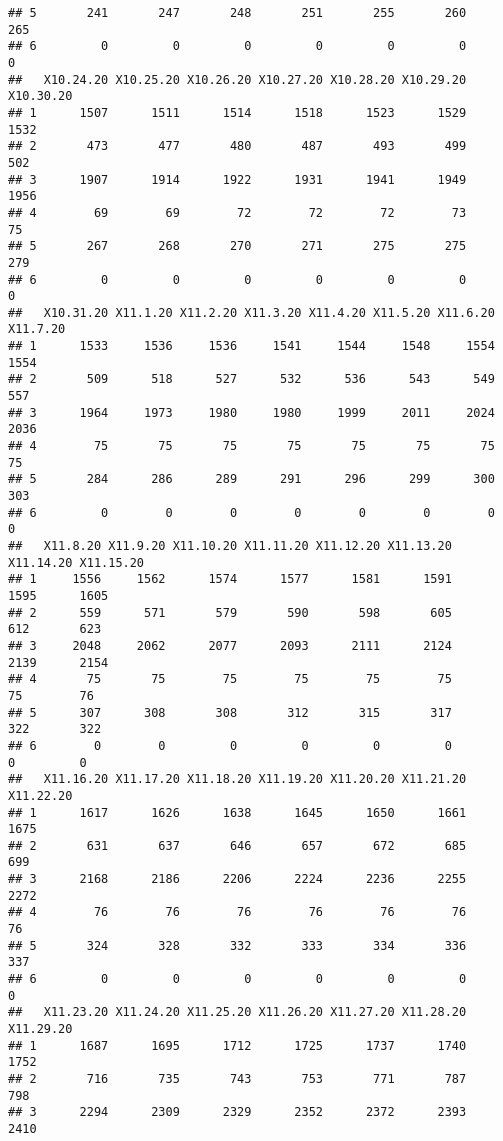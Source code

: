 \documentclass[
]{article}
\begin{document}
\begin{verbatim}
## 5       241       247       248       251       255       260       265
## 6         0         0         0         0         0         0         0
##   X10.24.20 X10.25.20 X10.26.20 X10.27.20 X10.28.20 X10.29.20 X10.30.20
## 1      1507      1511      1514      1518      1523      1529      1532
## 2       473       477       480       487       493       499       502
## 3      1907      1914      1922      1931      1941      1949      1956
## 4        69        69        72        72        72        73        75
## 5       267       268       270       271       275       275       279
## 6         0         0         0         0         0         0         0
##   X10.31.20 X11.1.20 X11.2.20 X11.3.20 X11.4.20 X11.5.20 X11.6.20 X11.7.20
## 1      1533     1536     1536     1541     1544     1548     1554     1554
## 2       509      518      527      532      536      543      549      557
## 3      1964     1973     1980     1980     1999     2011     2024     2036
## 4        75       75       75       75       75       75       75       75
## 5       284      286      289      291      296      299      300      303
## 6         0        0        0        0        0        0        0        0
##   X11.8.20 X11.9.20 X11.10.20 X11.11.20 X11.12.20 X11.13.20 X11.14.20 X11.15.20
## 1     1556     1562      1574      1577      1581      1591      1595      1605
## 2      559      571       579       590       598       605       612       623
## 3     2048     2062      2077      2093      2111      2124      2139      2154
## 4       75       75        75        75        75        75        75        76
## 5      307      308       308       312       315       317       322       322
## 6        0        0         0         0         0         0         0         0
##   X11.16.20 X11.17.20 X11.18.20 X11.19.20 X11.20.20 X11.21.20 X11.22.20
## 1      1617      1626      1638      1645      1650      1661      1675
## 2       631       637       646       657       672       685       699
## 3      2168      2186      2206      2224      2236      2255      2272
## 4        76        76        76        76        76        76        76
## 5       324       328       332       333       334       336       337
## 6         0         0         0         0         0         0         0
##   X11.23.20 X11.24.20 X11.25.20 X11.26.20 X11.27.20 X11.28.20 X11.29.20
## 1      1687      1695      1712      1725      1737      1740      1752
## 2       716       735       743       753       771       787       798
## 3      2294      2309      2329      2352      2372      2393      2410

\end{verbatim}
\end{document}
